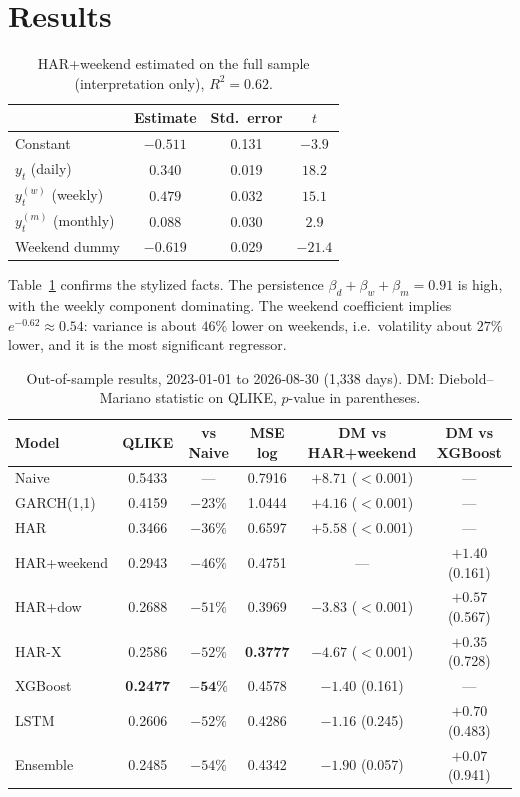 \documentclass[11pt,a4paper]{article}
\begin{document}
\section{Results}

\begin{table}[h]
\centering\small
\begin{tabular}{lccc}
\toprule
& Estimate & Std.\ error & $t$ \\
\midrule
Constant & $-0.511$ & 0.131 & $-3.9$ \\
$y_t$ (daily) & $0.340$ & 0.019 & $18.2$ \\
$y^{(w)}_t$ (weekly) & $0.479$ & 0.032 & $15.1$ \\
$y^{(m)}_t$ (monthly) & $0.088$ & 0.030 & $2.9$ \\
Weekend dummy & $-0.619$ & 0.029 & $-21.4$ \\
\bottomrule
\end{tabular}
\caption{HAR+weekend estimated on the full sample (interpretation only), $R^2=0.62$.}
\label{tab:har}
\end{table}

Table~\ref{tab:har} confirms the stylized facts. The persistence $\beta_d+\beta_w+\beta_m=0.91$ is high, with the weekly component dominating.
The weekend coefficient implies $e^{-0.62}\approx0.54$: variance is about $46\%$ lower on weekends, i.e.\ volatility about $27\%$ lower, and it is the most
significant regressor.

\begin{table}[h]
\centering\small
\begin{tabular}{lccccc}
\toprule
Model & QLIKE & vs Naive & MSE log & DM vs HAR+weekend & DM vs XGBoost \\
\midrule
Naive        & 0.5433 & ---       & 0.7916 & $+8.71$ ($<$0.001) & --- \\
GARCH(1,1)   & 0.4159 & $-23\%$   & 1.0444 & $+4.16$ ($<$0.001) & --- \\
HAR          & 0.3466 & $-36\%$   & 0.6597 & $+5.58$ ($<$0.001) & --- \\
HAR+weekend  & 0.2943 & $-46\%$   & 0.4751 & ---                & $+1.40$ (0.161) \\
HAR+dow      & 0.2688 & $-51\%$   & 0.3969 & $-3.83$ ($<$0.001) & $+0.57$ (0.567) \\
HAR-X        & 0.2586 & $-52\%$   & \textbf{0.3777} & $-4.67$ ($<$0.001) & $+0.35$ (0.728) \\
XGBoost      & \textbf{0.2477} & $\mathbf{-54\%}$ & 0.4578 & $-1.40$ (0.161) & --- \\
LSTM         & 0.2606 & $-52\%$   & 0.4286 & $-1.16$ (0.245)    & $+0.70$ (0.483) \\
Ensemble     & 0.2485 & $-54\%$   & 0.4342 & $-1.90$ (0.057)    & $+0.07$ (0.941) \\
\bottomrule
\end{tabular}
\caption{Out-of-sample results, 2023-01-01 to 2026-08-30 (1{,}338 days). DM: Diebold--Mariano statistic on QLIKE, $p$-value in parentheses.}
\label{tab:oos}
\end{table}
\end{document}
